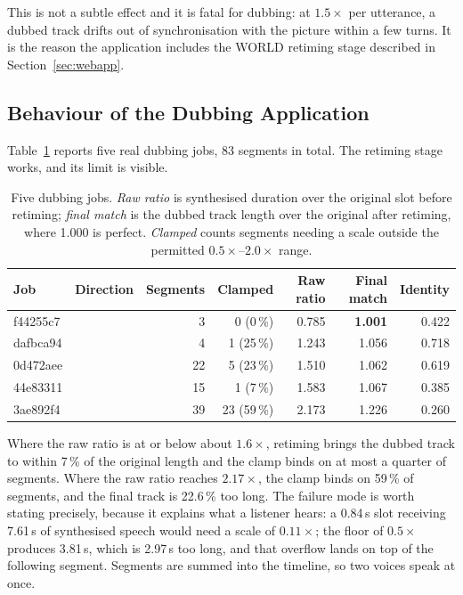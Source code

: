 This is not a subtle effect and it is fatal for dubbing: at $1.5\times$ per utterance, a dubbed
track drifts out of synchronisation with the picture within a few turns. It is the reason the
application includes the WORLD retiming stage described in Section~\ref{sec:webapp}.

\subsection{Behaviour of the Dubbing Application}
\label{sec:dubbing_result}

Table~\ref{tab:dubbing} reports five real dubbing jobs, 83 segments in total. The retiming stage
works, and its limit is visible.

\begin{table}[htbp]
\caption{Five dubbing jobs. \emph{Raw ratio} is synthesised duration over the original slot before
retiming; \emph{final match} is the dubbed track length over the original after retiming, where
1.000 is perfect. \emph{Clamped} counts segments needing a scale outside the permitted
$0.5\times$--$2.0\times$ range.}
\label{tab:dubbing}
\centering
{\singlespacing\small\setlength{\tabcolsep}{4.5pt}
\begin{tabular}{@{}lcrrrrr@{}}
\toprule
\textbf{Job} & \textbf{Direction} & \textbf{Segments} & \textbf{Clamped} &
\textbf{Raw ratio} & \textbf{Final match} & \textbf{Identity} \\
\midrule
f44255c7 & \esto{} & 3  & 0 (0\,\%)   & 0.785 & \textbf{1.001} & 0.422 \\
dafbca94 & \esto{} & 4  & 1 (25\,\%)  & 1.243 & 1.056 & 0.718 \\
0d472aee & \esto{} & 22 & 5 (23\,\%)  & 1.510 & 1.062 & 0.619 \\
44e83311 & \ento{} & 15 & 1 (7\,\%)   & 1.583 & 1.067 & 0.385 \\
3ae892f4 & \ento{} & 39 & 23 (59\,\%) & 2.173 & 1.226 & 0.260 \\
\bottomrule
\end{tabular}\par}
\end{table}

Where the raw ratio is at or below about $1.6\times$, retiming brings the dubbed track to within
7\,\% of the original length and the clamp binds on at most a quarter of segments. Where the raw
ratio reaches $2.17\times$, the clamp binds on 59\,\% of segments, and the final track is 22.6\,\%
too long. The failure mode is worth stating precisely, because it explains what a listener hears: a
0.84\,s slot receiving 7.61\,s of synthesised speech would need a scale of $0.11\times$; the floor
of $0.5\times$ produces 3.81\,s, which is 2.97\,s too long, and that overflow lands on top of the
following segment. Segments are summed into the timeline, so two voices speak at once.

